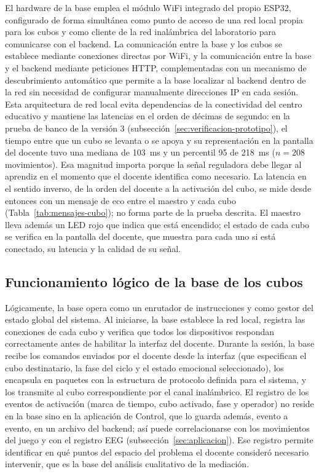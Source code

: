 \documentclass{book}
\begin{document}
El hardware de la base emplea el módulo WiFi integrado del propio ESP32,
configurado de forma simultánea como punto de acceso de una red local
propia para los cubos y como cliente de la red inalámbrica del
laboratorio para comunicarse con el backend. La comunicación entre la
base y los cubos se establece mediante conexiones directas por WiFi, y la
comunicación entre la base y el backend mediante peticiones HTTP,
complementadas con un mecanismo de descubrimiento automático que permite
a la base localizar al backend dentro de la red sin necesidad de
configurar manualmente direcciones IP en cada sesión. Esta arquitectura
de red local evita dependencias de la conectividad del centro educativo y
mantiene las latencias en el orden de décimas de segundo: en la prueba de banco de la versión 3 (subsección~\ref{sec:verificacion-prototipo}), el tiempo entre que un cubo se levanta o se apoya y su representación en la pantalla del docente tuvo una mediana de 103~ms y un percentil 95 de 218~ms ($n=208$ movimientos). Esa magnitud importa porque la señal reguladora debe llegar al aprendiz en el momento que el docente identifica como necesario. La latencia en el sentido inverso, de la orden del docente a la activación del cubo, se mide desde entonces con un mensaje de eco entre el maestro y cada cubo (Tabla~\ref{tab:mensajes-cubo}); no forma parte de la prueba descrita. El maestro lleva además un LED rojo que indica que está encendido; el estado de cada cubo se verifica en la pantalla del docente, que muestra para cada uno si está conectado, su latencia y la calidad de su señal.
 
\subsection{Funcionamiento lógico de la base de los cubos}
 
Lógicamente, la base opera como un enrutador de instrucciones y como
gestor del estado global del sistema. Al iniciarse, la base establece la
red local, registra las conexiones de cada cubo y verifica que todos los
dispositivos respondan correctamente antes de habilitar la interfaz del
docente. Durante la sesión, la base recibe los comandos enviados por el
docente desde la interfaz (que especifican el cubo destinatario, la fase
del ciclo y el estado emocional seleccionado), los encapsula en paquetes
con la estructura de protocolo definida para el sistema, y los transmite
al cubo correspondiente por el canal inalámbrico.
El registro de los eventos de activación (marca de tiempo, cubo activado, fase y operador) no reside en la base sino en la aplicación de Control, que lo guarda además, evento a evento, en un archivo del backend; así puede correlacionarse con los movimientos del juego y con el registro EEG (subsección~\ref{sec:aplicacion}). Ese registro permite identificar en qué puntos del espacio del problema el docente consideró necesario intervenir, que es la base del análisis cualitativo de la mediación.
\end{document}
